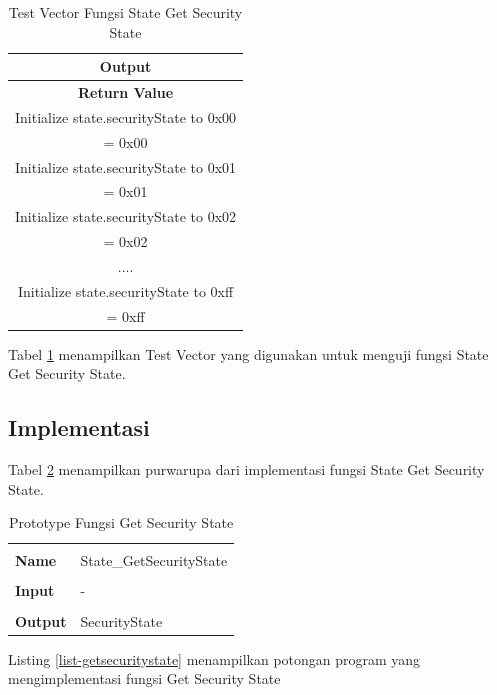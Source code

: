 \begin{table}[!h]
  \centering
  \begin{tabular}{ | c | }
    \hline
    \bf{Output} \\
    \hline
    \bf{Return Value} \\
    \hline
    Initialize state.securityState to 0x00 \\
    \hline
    = 0x00 \\
    \hline
    Initialize state.securityState to 0x01 \\
    \hline
    = 0x01 \\
    \hline
    Initialize state.securityState to 0x02 \\
    \hline
    = 0x02 \\
    \hline
    .... \\
    \hline
    Initialize state.securityState to 0xff \\
    \hline
    = 0xff \\
    \hline
  \end{tabular}
  \caption{Test Vector Fungsi State Get Security State}
  \label{tabel-test-getsecuritystate}
\end{table}

Tabel \ref{tabel-test-getsecuritystate} menampilkan Test Vector yang digunakan untuk menguji fungsi State Get Security State.

\subsection {Implementasi}

Tabel \ref{tabel-getsecuritystate} menampilkan purwarupa dari implementasi fungsi State Get Security State. 

\begin{table}[!h]
  \centering
  \begin{tabular}{p{2cm} p{8cm}}
    \hline\\
    {\bf Name} & State\_GetSecurityState\\
    \hline\\
    {\bf Input} & -
    \\
    \hline\\
    {\bf Output} & SecurityState
    \\
    \hline
  \end{tabular}
  \caption{Prototype Fungsi Get Security State}
  \label{tabel-getsecuritystate}
\end{table}

Listing \ref{list-getsecuritystate} menampilkan potongan program yang mengimplementasi fungsi Get Security State

